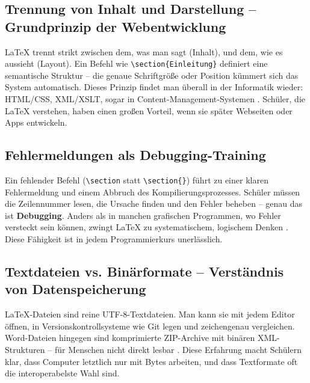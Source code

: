 \documentclass[a4paper,12pt]{article}
\begin{document}
	\subsection{Trennung von Inhalt und Darstellung – Grundprinzip der Webentwicklung}
	LaTeX trennt strikt zwischen dem, was man sagt (Inhalt), und dem, wie es aussieht (Layout). Ein Befehl wie \verb|\section{Einleitung}| definiert eine semantische Struktur – die genaue Schriftgröße oder Position kümmert sich das System automatisch. Dieses Prinzip findet man überall in der Informatik wieder: HTML/CSS, XML/XSLT, sogar in Content-Management-Systemen \cite{knuth-structured-documents}. Schüler, die LaTeX verstehen, haben einen großen Vorteil, wenn sie später Webseiten oder Apps entwickeln.
	
	\subsection{Fehlermeldungen als Debugging-Training}
	Ein fehlender Befehl (\verb|\section| statt \verb|\section{}|) führt zu einer klaren Fehlermeldung und einem Abbruch des Kompilierungsprozesses. Schüler müssen die Zeilennummer lesen, die Ursache finden und den Fehler beheben – genau das ist \textbf{Debugging}. Anders als in manchen grafischen Programmen, wo Fehler versteckt sein können, zwingt LaTeX zu systematischem, logischem Denken \cite{knuth-debugging}. Diese Fähigkeit ist in jedem Programmierkurs unerlässlich.
	
	\subsection{Textdateien vs. Binärformate – Verständnis von Datenspeicherung}
	LaTeX-Dateien sind reine UTF-8-Textdateien. Man kann sie mit jedem Editor öffnen, in Versionskontrollsysteme wie Git legen und zeichengenau vergleichen. Word-Dateien hingegen sind komprimierte ZIP-Archive mit binären XML-Strukturen – für Menschen nicht direkt lesbar \cite{knuth-textfiles}. Diese Erfahrung macht Schülern klar, dass Computer letztlich nur mit Bytes arbeiten, und dass Textformate oft die interoperabelste Wahl sind.
	
\end{document}
